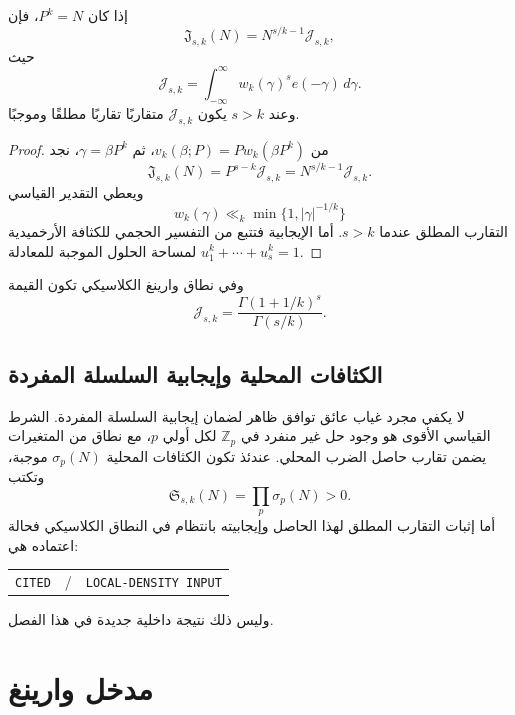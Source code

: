 \begin{proposition}
\label{prop:chapter17-singular-integral-scaling}
إذا كان $P^k=N$، فإن
\[
\mathfrak J_{s,k}(N)=N^{s/k-1}\mathcal J_{s,k},
\]
حيث
\[
\mathcal J_{s,k}
=
\int_{-\infty}^{\infty}w_k(\gamma)^s e(-\gamma)\,d\gamma.
\]
وعند $s>k$ يكون $\mathcal J_{s,k}$ متقاربًا تقاربًا مطلقًا وموجبًا.
\provedhere
\end{proposition}

\begin{proof}
من $v_k(\beta;P)=P w_k(\beta P^k)$، ثم $\gamma=\beta P^k$، نجد
\[
\mathfrak J_{s,k}(N)
=P^{s-k}\mathcal J_{s,k}
=N^{s/k-1}\mathcal J_{s,k}.
\]
ويعطي التقدير القياسي
\[
w_k(\gamma)\ll_k\min\{1,|\gamma|^{-1/k}\}
\]
التقارب المطلق عندما $s>k$. أما الإيجابية فتتبع من التفسير الحجمي للكثافة الأرخميدية لمساحة الحلول الموجبة للمعادلة $u_1^k+\cdots+u_s^k=1$.
\end{proof}

وفي نطاق وارينغ الكلاسيكي تكون القيمة
\[
\mathcal J_{s,k}
=
\frac{\Gamma(1+1/k)^s}{\Gamma(s/k)}.
\]

\subsection{الكثافات المحلية وإيجابية السلسلة المفردة}

لا يكفي مجرد غياب عائق توافق ظاهر لضمان إيجابية السلسلة المفردة. الشرط القياسي الأقوى هو وجود حل غير منفرد في $\mathbb Z_p$ لكل أولي $p$، مع نطاق من المتغيرات يضمن تقارب حاصل الضرب المحلي. عندئذ تكون الكثافات المحلية $\sigma_p(N)$ موجبة، وتكتب
\[
\mathfrak S_{s,k}(N)=\prod_p\sigma_p(N)>0.
\]
أما إثبات التقارب المطلق لهذا الحاصل وإيجابيته بانتظام في النطاق الكلاسيكي فحالة اعتماده هي:

\begin{center}
\small
\begin{tabular}{ccc}
\textenglish{\texttt{CITED}} & / & \textenglish{\texttt{LOCAL-DENSITY INPUT}}
\end{tabular}
\end{center}

وليس ذلك نتيجة داخلية جديدة في هذا الفصل.

\section{مدخل وارينغ}

